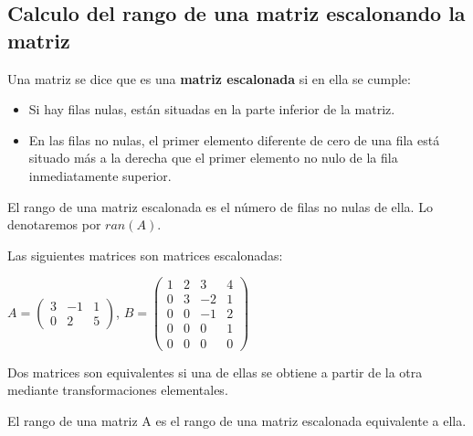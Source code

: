 \subsection{Calculo del rango de una matriz escalonando la matriz}
\begin{definicion}
Una matriz se dice que es una \textbf{matriz escalonada} si en ella se cumple:
\begin{itemize}
\item Si hay filas nulas, están situadas en la parte inferior de la matriz.
\item En las filas no nulas, el primer elemento diferente de cero de una fila está situado más a la derecha que el primer elemento no nulo de la fila inmediatamente superior.
\end{itemize}

El rango de una matriz escalonada es el número de filas no nulas de ella. Lo denotaremos por $ran(A)$.
\end{definicion}

Las siguientes matrices son matrices escalonadas:

$A=\begin{pmatrix}
3 & -1 & 1 \\ 0 & 2 & 5 
\end{pmatrix}
$, $B=\begin{pmatrix}
1 & 2 & 3 & 4 \\
0 & 3 & -2 & 1 \\
0 & 0 & -1 & 2 \\
0 & 0 & 0 & 1 \\
0 & 0 & 0 & 0 
\end{pmatrix}$


\begin{definicion}
Dos matrices son equivalentes si una de ellas se obtiene a partir de la otra mediante transformaciones elementales.

El rango de una matriz A es el rango de una matriz escalonada equivalente a ella.
\end{definicion}

